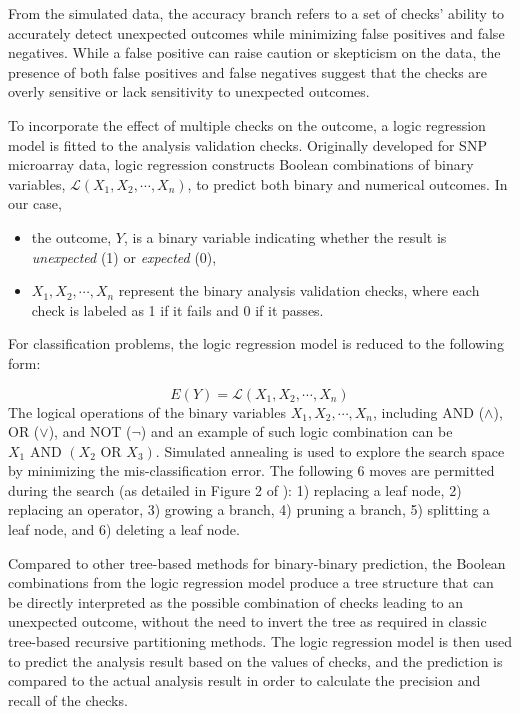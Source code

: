 \documentclass[
  12pt,
]{interact}
\providecommand{\tightlist}{%
  \setlength{\itemsep}{0pt}\setlength{\parskip}{0pt}}\usepackage{longtable,booktabs,array}
\begin{document}
From the simulated data, the accuracy branch refers to a set of checks'
ability to accurately detect unexpected outcomes while minimizing false
positives and false negatives. While a false positive can raise caution
or skepticism on the data, the presence of both false positives and
false negatives suggest that the checks are overly sensitive or lack
sensitivity to unexpected outcomes.

To incorporate the effect of multiple checks on the outcome, a logic
regression model \citep{ruczinski_logic_2003} is fitted to the analysis
validation checks. Originally developed for SNP microarray data, logic
regression constructs Boolean combinations of binary variables,
\(\mathcal{L}(X_1, X_2, \cdots, X_n)\), to predict both binary and
numerical outcomes. In our case,

\begin{itemize}
\tightlist
\item
  the outcome, \(Y\), is a binary variable indicating whether the result
  is \emph{unexpected} (1) or \emph{expected} (0),
\item
  \(X_1, X_2, \cdots, X_n\) represent the binary analysis validation
  checks, where each check is labeled as 1 if it fails and 0 if it
  passes.
\end{itemize}

For classification problems, the logic regression model is reduced to
the following form:

\[E(Y) = \mathcal{L}(X_1, X_2, \cdots, X_n)\] The logical operations of
the binary variables \(X_1, X_2, \cdots, X_n\), including AND
(\(\land\)), OR (\(\lor\)), and NOT (\(\neg\)) and an example of such
logic combination can be \(X_1 \text{ AND } (X_2 \text{ OR } X_3)\).
Simulated annealing is used to explore the search space by minimizing
the mis-classification error. The following 6 moves are permitted during
the search (as detailed in Figure 2 of \citet{ruczinski_logic_2003}): 1)
replacing a leaf node, 2) replacing an operator, 3) growing a branch, 4)
pruning a branch, 5) splitting a leaf node, and 6) deleting a leaf node.

Compared to other tree-based methods for binary-binary prediction, the
Boolean combinations from the logic regression model produce a tree
structure that can be directly interpreted as the possible combination
of checks leading to an unexpected outcome, without the need to invert
the tree as required in classic tree-based recursive partitioning
methods. The logic regression model is then used to predict the analysis
result based on the values of checks, and the prediction is compared to
the actual analysis result in order to calculate the precision and
recall of the checks.
\end{document}
